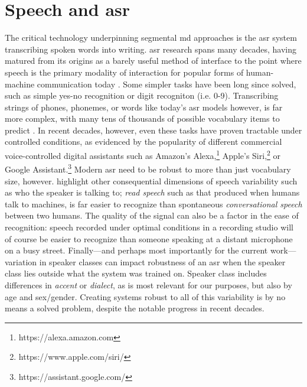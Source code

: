 \documentclass[thesis]{cluu}
\begin{document}
\section{Speech and \Gls{asr}}
The critical technology underpinning segmental \gls{md} approaches is the \gls{asr} system transcribing spoken words into writing. \gls{asr} research spans many decades, having matured from its origins as a barely useful method of interface to the point where speech is the primary modality of interaction for popular forms of human-machine communication today \parencite{yuAutomaticSpeechRecognition2015}. Some simpler tasks have been long since solved, such as simple yes-no recognition or digit recogniton (i.e. 0-9). Transcribing strings of phones, phonemes, or words like today's \gls{asr} models however, is far more complex, with many tens of thousands of possible vocabulary items to predict \parencite{jurafskySpeechLanguageProcessing2025}. In recent decades, however, even these tasks have proven tractable under controlled conditions, as evidenced by the popularity of different commercial voice-controlled digital assistants such as Amazon's Alexa,\footnote{https://alexa.amazon.com} Apple's Siri,\footnote{https://www.apple.com/siri/} or Google Assistant.\footnote{https://assistant.google.com/} Modern \gls{asr} need to be robust to more than just vocabulary size, however. \textcite{jurafskySpeechLanguageProcessing2025} highlight other consequential dimensions of speech variability such as who the speaker is talking to; \textit{read speech} such as that produced when humans talk to machines, is far easier to recognize than spontaneous \textit{conversational speech} between two humans. The quality of the signal can also be a factor in the ease of recognition: speech recorded under optimal conditions in a recording studio will of course be easier to recognize than someone speaking at a distant microphone on a busy street. Finally---and perhaps most importantly for the current work---variation in speaker classes can impact robustness of an \gls{asr} when the speaker class lies outside what the system was trained on. Speaker class includes differences in \textit{accent} or \textit{dialect}, as is most relevant for our purposes, but also by age and sex/gender. Creating systems robust to all of this variability is by no means a solved problem, despite the notable progress in recent decades.
\end{document}
